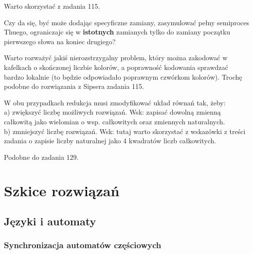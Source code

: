 \documentclass[a4paper,11pt]{article}
\newenvironment{zadanie}[1]
  {\renewcommand\theinnercustomthm{#1}\innercustomthm}
  {\endinnercustomthm}
\begin{document}
\begin{zadanie}{116}
Warto skorzystać z zadania 115.
\end{zadanie}

\begin{zadanie}{118}
Czy da się, być może dodając specyficzne zamiany, zasymulować pełny semiproces Thuego, ograniczajc się w \textbf{istotnych} 
zamianych tylko do zamiany początku pierwszego słowa na koniec drugiego?
\end{zadanie}

\begin{zadanie}{120}
 Warto rozważyć jakiś nierozstrzygalny problem, który można zakodować w kafelkach o skończonej liczbie kolorów, a poprawność
 kodowania sprawdzać bardzo lokalnie (to będzie odpowiadało poprawnym czwórkom kolorów). Trochę podobne do rozwiązania 
 z Sipsera zadania 115.
\end{zadanie}

\begin{zadanie}{121}
 W obu przypadkach redukcja musi zmodyfikować układ równań tak, żeby:\\
 a) zwiększyć liczbę możliwych rozwiązań. Wsk: zapisać dowolną zmienną całkowitą jako wielomian o wsp. całkowitych oraz 
 zmiennych naturalnych. \\
 b) zmniejszyć liczbę rozwiązań. Wsk: tutaj warto skorzystać z wskazówki z treści zadania o zapisie liczby naturalnej 
 jako 4 kwadratów liczb całkowitych.
\end{zadanie}

\begin{zadanie}{122}
 Podobne do zadania 129.
\end{zadanie}

\section{Szkice rozwiązań}

\subsection{Języki i automaty}

\subsubsection{Synchronizacja automatów częściowych}

\begin{zadanie}{40}
\end{zadanie}
\end{document}
